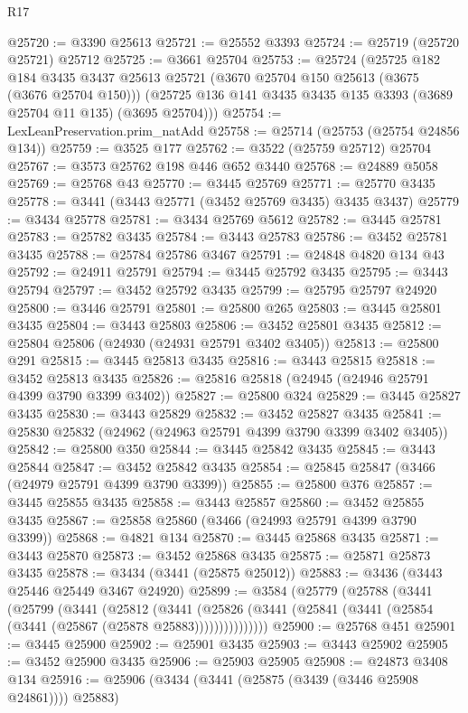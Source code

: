\begin{lexlean}{R17}
\begin{coremodule}
@25720 := @3390 @25613
@25721 := @25552 @3393
@25724 := @25719 (@25720 @25721) @25712
@25725 := @3661 @25704
@25753 := @25724
    (@25725
      @182
      @184
      @3435
      @3437
      @25613
      @25721
      (@3670 @25704 @150 @25613 (@3675 (@3676 @25704 @150)))
      (@25725 @136 @141 @3435 @3435 @135 @3393 (@3689 @25704 @11 @135) (@3695 @25704)))
@25754 := LexLeanPreservation.prim_natAdd
@25758 := @25714 (@25753 (@25754 @24856 @134))
@25759 := @3525 @177
@25762 := @3522 (@25759 @25712) @25704
@25767 := @3573 @25762 @198 @446 @652 @3440
@25768 := @24889 @5058
@25769 := @25768 @43
@25770 := @3445 @25769
@25771 := @25770 @3435
@25778 := @3441 (@3443 @25771 (@3452 @25769 @3435) @3435 @3437)
@25779 := @3434 @25778
@25781 := @3434 @25769 @5612
@25782 := @3445 @25781
@25783 := @25782 @3435
@25784 := @3443 @25783
@25786 := @3452 @25781 @3435
@25788 := @25784 @25786 @3467
@25791 := @24848 @4820 @134 @43
@25792 := @24911 @25791
@25794 := @3445 @25792 @3435
@25795 := @3443 @25794
@25797 := @3452 @25792 @3435
@25799 := @25795 @25797 @24920
@25800 := @3446 @25791
@25801 := @25800 @265
@25803 := @3445 @25801 @3435
@25804 := @3443 @25803
@25806 := @3452 @25801 @3435
@25812 := @25804 @25806 (@24930 (@24931 @25791 @3402 @3405))
@25813 := @25800 @291
@25815 := @3445 @25813 @3435
@25816 := @3443 @25815
@25818 := @3452 @25813 @3435
@25826 := @25816 @25818 (@24945 (@24946 @25791 @4399 @3790 @3399 @3402))
@25827 := @25800 @324
@25829 := @3445 @25827 @3435
@25830 := @3443 @25829
@25832 := @3452 @25827 @3435
@25841 := @25830 @25832 (@24962 (@24963 @25791 @4399 @3790 @3399 @3402 @3405))
@25842 := @25800 @350
@25844 := @3445 @25842 @3435
@25845 := @3443 @25844
@25847 := @3452 @25842 @3435
@25854 := @25845 @25847 (@3466 (@24979 @25791 @4399 @3790 @3399))
@25855 := @25800 @376
@25857 := @3445 @25855 @3435
@25858 := @3443 @25857
@25860 := @3452 @25855 @3435
@25867 := @25858 @25860 (@3466 (@24993 @25791 @4399 @3790 @3399))
@25868 := @4821 @134
@25870 := @3445 @25868 @3435
@25871 := @3443 @25870
@25873 := @3452 @25868 @3435
@25875 := @25871 @25873 @3435
@25878 := @3434 (@3441 (@25875 @25012))
@25883 := @3436 (@3443 @25446 @25449 @3467 @24920)
@25899 := @3584
    (@25779
      (@25788
        (@3441
          (@25799
            (@3441
              (@25812
                (@3441
                  (@25826 (@3441 (@25841 (@3441 (@25854 (@3441 (@25867 (@25878 @25883)))))))))))))))
@25900 := @25768 @451
@25901 := @3445 @25900
@25902 := @25901 @3435
@25903 := @3443 @25902
@25905 := @3452 @25900 @3435
@25906 := @25903 @25905
@25908 := @24873 @3408 @134
@25916 := @25906 (@3434 (@3441 (@25875 (@3439 (@3446 @25908 @24861)))) @25883)

\end{coremodule}
\end{lexlean}
